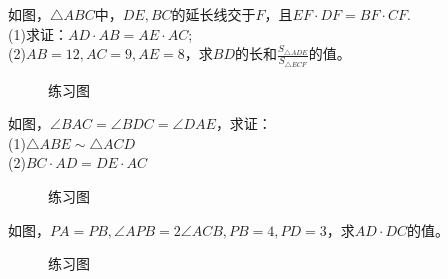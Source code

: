 \begin{problem}
如图，$\triangle ABC$中，$DE,BC$的延长线交于$F$，且$EF·DF=BF·CF$. \\
(1)求证：$AD·AB=AE·AC$; \\
(2)$AB=12,AC=9,AE=8$，求$BD$的长和$\frac{S_{\triangle ADE}}{S_{\triangle ECF}}$的值。\\
\end{problem}
\begin{figure}[H]
    \centering
    \resizebox{4cm}{!}{}
    \caption{练习图}
\end{figure}
\begin{problem}
如图，$\angle BAC=\angle BDC=\angle DAE$，求证：\\
(1)$\triangle ABE \sim \triangle ACD$ \\
(2)$BC·AD=DE·AC$ \\
\end{problem}
\begin{figure}[H]
    \centering
    \resizebox{4cm}{!}{}
    \caption{练习图}
\end{figure}
\begin{problem}
如图，$PA=PB,\angle APB=2\angle ACB,PB=4,PD=3$，求$AD·DC$的值。
\end{problem}
\begin{figure}[H]
    \centering
    \resizebox{4cm}{!}{}
    \caption{练习图}
\end{figure}
\clearpage
